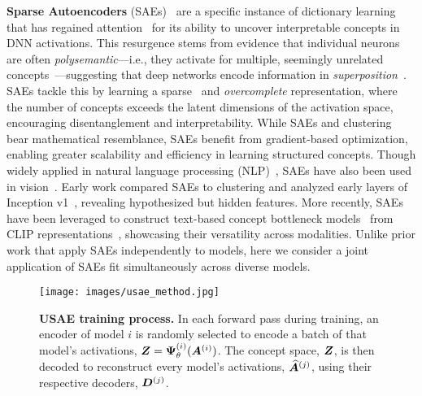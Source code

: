 \noindent\textbf{Sparse Autoencoders} (SAEs)~\cite{cunningham2023sparse, bricken2023monosemanticity, rajamanoharan2024jumping, gao2024scaling,menon2024analyzing} are a specific instance of dictionary learning~\cite{rubinstein2010dictionaries,elad2010sparse,tovsic2011dictionary,mairal2014sparse,dumitrescu2018dictionary} that has regained attention~\cite{chen2021low,tasissa2023kds,baccouche2012spatio, tariyal2016deep,papyan2017convolutional,mahdizadehaghdam2019deep,yu2023white} for its ability to uncover interpretable concepts in DNN activations. This resurgence stems from evidence that individual neurons are often \textit{polysemantic}—i.e., they activate for multiple, seemingly unrelated concepts~\cite{nguyen2019understanding,elhage2022toy}—suggesting that deep networks encode information in \textit{superposition}~\cite{elhage2022toy}. SAEs tackle this by learning a sparse~\cite{hurley2009comparing,eamaz2022building} and \textit{overcomplete} representation, where the number of concepts exceeds the latent dimensions of the activation space, encouraging disentanglement and interpretability. 
While SAEs and clustering bear mathematical resemblance, SAEs benefit from gradient-based optimization, enabling greater scalability and efficiency in learning structured concepts.  
Though widely applied in natural language processing (NLP)~\cite{wattenberg2024relational, lwcomposition,chanin2024absorption,tamkin2023codebook}, SAEs have also been used in vision~\cite{fel2023holistic, surkov2024unpacking,bhalla2024interpreting}. Early work compared SAEs to clustering and analyzed early layers of Inception v1~\cite{mordvintsev2015Inceptionism,gorton2024missing}, revealing hypothesized but hidden features. More recently, SAEs have been leveraged to construct text-based concept bottleneck models~\cite{koh2020concept} from CLIP representations~\cite{radford2021learning,rao2024discover,parekh2024concept,bhalla2024towards}, showcasing their versatility across modalities. Unlike prior work that apply SAEs independently to %
models, here we consider a joint application of SAEs fit simultaneously 
across diverse models. %


\begin{figure}[t]
    \centering
    \texttt{[image: images/usae\_method.jpg]}
    \vspace{-18pt}
    \caption{\textbf{USAE training process.} In each forward pass during training, an encoder of model $i$ is randomly selected to encode a batch of that model's activations, $\bm{Z} = \bm{\Psi}_{\theta}^{(i)}(\bm{A}^{(i)})$. The concept space, $ \bm{Z} $, is then decoded to reconstruct every model's activations, $ \widehat{\bm{A}}^{(j)} $, using their respective decoders, $ \bm{D}^{(j)}$.}
    \vspace{-6mm}
    \label{fig:method}
\end{figure}

